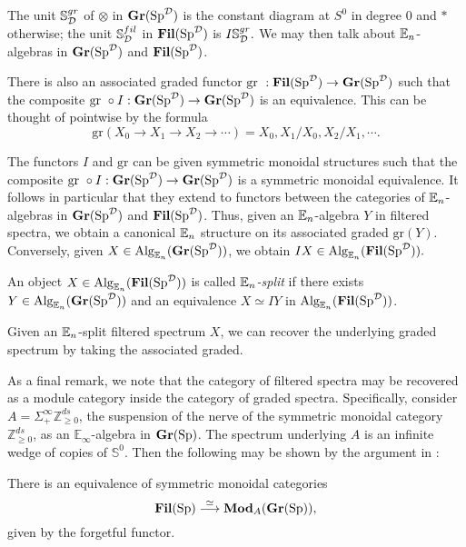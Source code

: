 The unit $\mathbb{S}^{gr}_{\D}$ of $\otimes$ in $\Gr(\Sp^{\D})$ is the constant diagram at $S^0$ in degree 0 and $*$ otherwise; the unit $\mathbb{S}^{fil}_{\D}$ in $\Fil(\Sp^{\D})$ is $I\mathbb{S}^{gr}_{\D}.$  We may then talk about $\E_n$-algebras in $\Gr(\Sp^{\D})$ and $\Fil(\Sp^{\D})$.  



There is also an associated graded functor $\text{gr }: \Fil(\Sp^{\D}) \to \Gr(\Sp^{\D})$ such that the composite $\text{gr }\circ I : \Gr(\Sp^{\D}) \to \Gr(\Sp^{\D})$ is an equivalence.   This can be thought of pointwise by the formula $$\text{gr}(X_0\to X_1\to X_2\to \cdots) = X_0, X_1/X_0, X_2/X_1, \cdots.$$




The functors $I$ and $\text{gr}$ can be given symmetric monoidal structures such that the composite $\text{gr }\circ I : \Gr(\Sp^{\D}) \to \Gr(\Sp^{\D})$ is a symmetric monoidal equivalence.  It follows in particular that they extend to functors between the categories of $\E_n$-algebras in $\Gr(\Sp^{\D})$ and $\Fil(\Sp^{\D})$.  Thus, given an $\E_n$-algebra $Y$ in filtered spectra, we obtain a canonical $\E_n$ structure on its associated graded $\text{gr}(Y).$  Conversely, given $X\in \Alg_{\E_n}(\Gr(\Sp^{\D}))$, we obtain $IX\in \Alg_{\E_n}(\Fil(\Sp^{\D})).$  

\begin{dfn}
An object $X\in \Alg_{\E_n}(\Fil(\Sp^{\D}))$ is called \emph{$\E_n$-split} if there exists $Y\in \Alg_{\E_n}(\Gr(\Sp^{\D}))$ and an equivalence $X \simeq IY$ in $\Alg_{\E_n}(\Fil(\Sp^{\D}))$.  
\end{dfn}

Given an $\E_n$-split filtered spectrum $X$, we can recover the underlying graded spectrum by taking the associated graded. 

As a final remark, we note that the category of filtered spectra may be recovered as a module category inside the category of graded spectra.  Specifically, consider $A=\Sigma^{\infty}_+ \mathbb{Z}^{ds}_{\ge 0}$, the suspension of the nerve of the symmetric monoidal category $\mathbb{Z}^{ds}_{\ge 0}$, as an $\mathbb{E}_\infty$-algebra in $\Gr(\Sp)$.  The spectrum underlying $A$ is an infinite wedge of copies of $\mathbb{S}^0$.  Then the following may be shown by the argument in \cite[Proposition 3.1.6]{LurieRot}:

\begin{lem} \label{lem:FilAsGrMod}
There is an equivalence of symmetric monoidal categories
$$\Fil(\Sp) \stackrel{\simeq}{\longrightarrow} \textbf{Mod}_{A}(\Gr(\Sp)),$$
given by the forgetful functor.
\end{lem}


